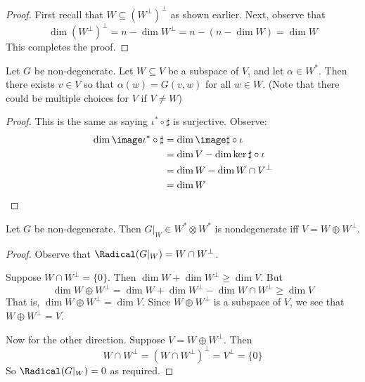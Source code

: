 \begin{proof}
    First recall that $W\subseteq (W^\perp)^\perp$ as shown earlier. Next, observe that
    \[\dim (W^\perp)^\perp = n-\dim W^\perp = n-(n-\dim W) = \dim W\] 
    This completes the proof.
\end{proof}
\begin{cor}
    Let $G$ be non-degenerate. Let $W\subseteq V$ be a subspace of $V$, and let $\alpha \in W^*$. Then there exists $v\in V$ so that $\alpha(w)=G(v,w)$ for all $w\in W$. (Note that there could be multiple choices for $V$ if $V\neq W$)
\end{cor}
\begin{proof}
    This is the same as saying $\iota^* \circ \sharp$ is surjective. Observe: \begin{align*}\dim \image \iota^* \circ \sharp &= \dim \image\sharp \circ \iota \\&= \dim V - \dim \ker \sharp\circ\iota \\&= \dim W - \dim W\cap V^\perp \\&= \dim W\end{align*}
\end{proof}
\begin{cor}\label{cor4}Let $G$ be non-degenerate. Then $G|_W \in W^*\otimes W^*$ is nondegenerate iff $V = W \oplus W^\perp$.
\end{cor}
\begin{proof}
    Observe that $\Radical(G|_W) = W\cap W^\perp$. 
    
    Suppose $W\cap W^\perp = \{0\}$. Then $\dim W + \dim W^\perp \geq \dim V$. 
    But \[\dim W\oplus W^\perp = \dim W + \dim W^\perp -\dim W\cap W^\perp \geq \dim V\]
    That is, $\dim W\oplus W^\perp = \dim V$. Since $W\oplus W^\perp $ is a subspace of $V$, we see that $W\oplus W^\perp = V$.

    Now for the other direction. Suppose $V = W\oplus W^\perp$. Then \[W\cap W^\perp = (W\cap W^\perp)^\perp = V^\perp = \{0\}\]
    So $\Radical(G|_W)=0$ as required.
\end{proof}


